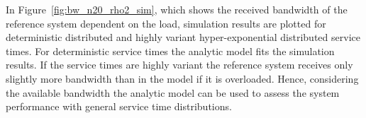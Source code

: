 
In Figure~\ref{fig:bw_n20_rho2_sim}, which shows the received bandwidth of the reference system dependent on the load, simulation results are plotted for deterministic distributed and highly variant hyper-exponential distributed service times.
For deterministic service times the analytic model fits the simulation results. If the service times are highly variant the reference system receives only slightly more bandwidth than in the model if it is overloaded. Hence, considering the available bandwidth the analytic model can be used to assess the system performance with general service time distributions.

